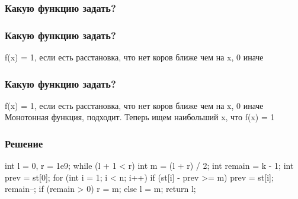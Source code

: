 \begin{frame}
    \frametitle{Какую функцию задать?}
\end{frame}

\begin{frame}
    \frametitle{Какую функцию задать?}
    f(x) = 1, если есть расстановка, что нет коров ближе чем на x, 0 иначе
\end{frame}

\begin{frame}
    \frametitle{Какую функцию задать?}
    f(x) = 1, если есть расстановка, что нет коров ближе чем на x, 0 иначе\\
    Монотонная функция, подходит. Теперь ищем наибольший x, что f(x) = 1
\end{frame}

\begin{frame}[fragile]
    \frametitle{Решение}
    \begin{cpp}
int l = 0, r = 1e9;
while (l + 1 < r) {
    int m = (l + r) / 2;
    int remain = k - 1;
    int prev = st[0];
    for (int i = 1; i < n; i++) {
        if (st[i] - prev >= m) {
            prev = st[i];
            remain--;
        }
    }
    if (remain > 0) {
        r = m;
    } else l = m;
}
return l;
    \end{cpp}
\end{frame}

